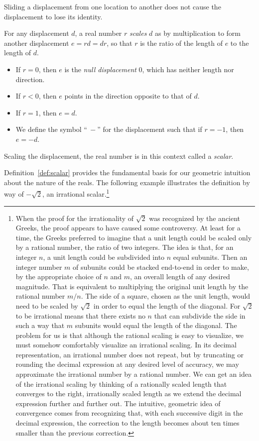 \noindent Sliding a displacement from one location to another does not cause
the displacement to lose its identity.

\begin{definition}[Scaling]
   For any displacement $d$, a real number $r$ \emph{scales} $d$ as
   by multiplication to form another displacement $e = r d =
   d r$, so that $r$ is the ratio of the length of $e$ to the
   length of $d$.
   \begin{itemize}
      \item If $r = 0$, then $e$ is the \emph{null displacement}
         $0$, which has neither length nor direction.
      \item If $r < 0$, then $e$ points in the direction opposite to that
         of $d$.
      \item If $r = 1$, then $e = d$.
      \item We define the symbol ``$\:-$'' for the displacement such that if $r
         = -1$, then $e = -d$.
   \end{itemize}
   Scaling the displacement, the real number is in this context called a
   \emph{scalar}.
\label{def:scalar}
\end{definition}

\noindent Definition~\ref{def:scalar} provides the fundamental basis for our
geometric intuition about the nature of the reals. The following example
illustrates the definition by way of $-\sqrt{2}$, an irrational
scalar.\footnote{%
   When the proof for the irrationality of $\sqrt{2}$ was recognized by the
   ancient Greeks, the proof appears to have caused some controversy. At least
   for a time, the Greeks preferred to imagine that a unit length could be
   scaled only by a rational number, the ratio of two integers. The idea is
   that, for an integer $n$, a unit length could be subdivided into $n$ equal
   subunits. Then an integer number $m$ of subunits could be stacked end-to-end
   in order to make, by the appropriate choice of $n$ and $m$, an overall
   length of any desired magnitude. That is equivalent to multiplying the
   original unit length by the rational number $m/n$. The side of a square,
   chosen as the unit length, would need to be scaled by $\sqrt{2}$ in order to
   equal the length of the diagonal. For $\sqrt{2}$ to be irrational means that
   there exists no $n$ that can subdivide the side in such a way that $m$
   subunits would equal the length of the diagonal. The problem for us is that
   although the rational scaling is easy to visualize, we must somehow
   comfortably visualize an irrational scaling.  In its decimal representation,
   an irrational number does not repeat, but by truncating or rounding the
   decimal expression at any desired level of accuracy, we may approximate the
   irrational number by a rational number.  We can get an idea of the
   irrational scaling by thinking of a rationally scaled length that converges
   to the right, irrationally scaled length as we extend the decimal expression
   further and further out. The intuitive, geometric idea of convergence comes
   from recognizing that, with each successive digit in the decimal expression,
   the correction to the length becomes about ten times smaller than the
   previous correction.
}


